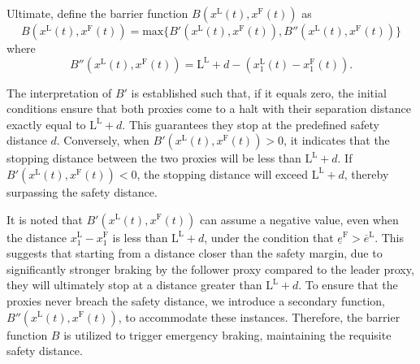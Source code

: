 Ultimate, define the barrier function $B\left(x^\mathrm{L}\left(t\right),x^\mathrm{F}\left(t\right)\right)$ as
%
\begin{equation}
	B\left(x^\mathrm{L}\left(t\right),x^\mathrm{F}\left(t\right)\right)= \text{max}\{B'\left(x^\mathrm{L}\left(t\right),x^\mathrm{F}\left(t\right)\right), B''\left(x^\mathrm{L}\left(t\right),x^\mathrm{F}\left(t\right)\right) \}
\end{equation}
%
where
\begin{equation} \label{eq:Bsecond}
	B''\left(x^\mathrm{L}\left(t\right),x^\mathrm{F}\left(t\right)\right)=  \mathrm{L}^\mathrm{L} + d - \left(x_1^\mathrm{L}\left(t\right)-x_1^\mathrm{F}\left(t\right)\right).
\end{equation}



The interpretation of $B'$ is established such that, if it equals zero, the initial conditions ensure that both proxies come to a halt with their separation distance exactly equal to $\mathrm{L}^\mathrm{L}+d$. This guarantees they stop at the predefined safety distance $d$. Conversely, when $B'\left(x^\mathrm{L}\left(t\right),x^\mathrm{F}\left(t\right)\right) > 0$, it indicates that the stopping distance between the two proxies will be less than $\mathrm{L}^\mathrm{L}+d$. If $B'\left(x^\mathrm{L}\left(t\right),x^\mathrm{F}\left(t\right)\right) < 0$, the stopping distance will exceed $\mathrm{L}^\mathrm{L}+d$, thereby surpassing the safety distance.

It is noted that $B'\left(x^\mathrm{L}\left(t\right),x^\mathrm{F}\left(t\right)\right)$ can assume a negative value, even when the distance $x_1^\mathrm{L}-x_1^\mathrm{F}$ is less than $\mathrm{L}^\mathrm{L}+d$, under the condition that $\underline{e}^\mathrm{F} > \overline{e}^\mathrm{L}$. This suggests that starting from a distance closer than the safety margin, due to significantly stronger braking by the follower proxy compared to the leader proxy, they will ultimately stop at a distance greater than $\mathrm{L}^\mathrm{L}+d$. To ensure that the proxies never breach the safety distance, we introduce a secondary function, $B''\left(x^\mathrm{L}\left(t\right),x^\mathrm{F}\left(t\right)\right)$, to accommodate these instances. Therefore, the barrier function $B$ is utilized to trigger emergency braking, maintaining the requisite safety distance.


